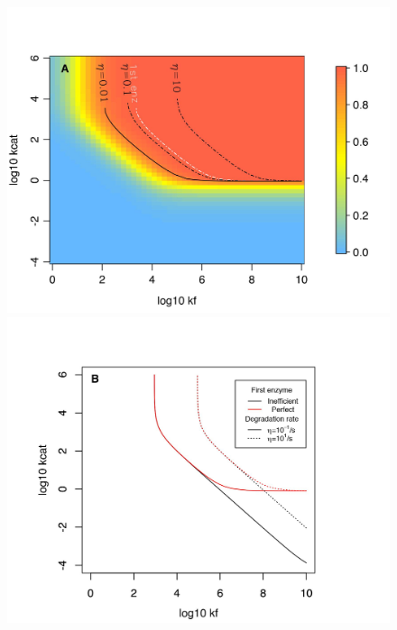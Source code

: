 \begin{figure}[h!]
\begin{center}
\begin{minipage}[c]{0.52\linewidth}
\includegraphics[scale=0.55]{pics/SM-Enzymes/2DFitLandscape_etahigh_noreverse_HF.jpeg} 
\end{minipage} \hfill
\begin{minipage}[c]{0.47\linewidth}
\includegraphics[scale=0.55]{pics/SM-Enzymes/2DFit_Landscape_2Enz_First_Enz_Influence_HF.jpeg} 

\end{minipage}
\end{center}
\end{figure}
